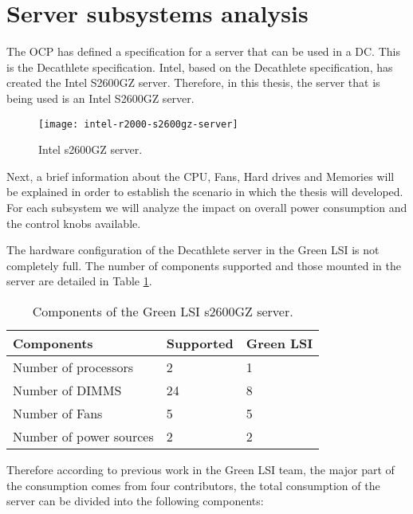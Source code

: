 \section{Server subsystems analysis}

The OCP has defined a specification for a server that can be used in a DC. This is the Decathlete specification. Intel, based on the Decathlete specification, has created the Intel S2600GZ server. Therefore, in this thesis, the server that is being used is an Intel S2600GZ server. \cite{serverSpecif} \cite{serverGuide}

\begin{figure}[H]
\texttt{[image: intel-r2000-s2600gz-server]} %
\caption{Intel s2600GZ server.}
\label{fig:decathlete} %
\end{figure}

Next, a brief information about the CPU, Fans, Hard drives and Memories will be explained in order to establish the scenario in which the thesis will developed. For each subsystem we will analyze the impact on overall power consumption and the control knobs available.

The hardware configuration of the Decathlete server in the Green LSI is not completely full. The number of components supported and those mounted in the server are detailed in Table \ref{tab:components}.

\begin{table}[H]
\begin{center}
\begin{tabular}{p{6cm} p{3cm} p{3cm}}
  \hline
  Components & Supported & Green LSI \\
  \hline
  Number of processors & 2 & 1 \\
  Number of DIMMS & 24 & 8 \\
  Number of Fans & 5 & 5 \\
  Number of power sources & 2 & 2 \\
  \hline
\end{tabular}
\end{center}
\caption{Components of the Green LSI s2600GZ server.}
\label{tab:components}
\end{table}

Therefore  according to previous work in the Green LSI team, the major part of the consumption comes from four contributors, the total consumption of the server can be divided into the following components:

